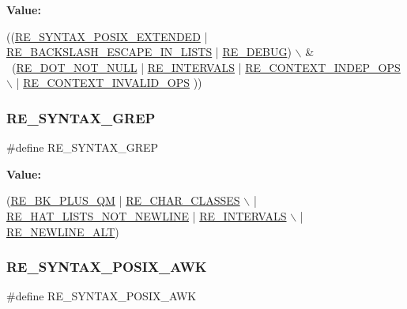 {\bfseries Value\+:}
\begin{DoxyCode}
((\hyperlink{a00092_a18701b3ee3894b158993efa18f3958ec}{RE\_SYNTAX\_POSIX\_EXTENDED} | 
      \hyperlink{a00092_a45356e84c34c98ed125ea5f75814ccc5}{RE\_BACKSLASH\_ESCAPE\_IN\_LISTS} | \hyperlink{a00092_a8b5102c6c1d783f324012804b26e82cb}{RE\_DEBUG})    \(\backslash\)
   & ~(\hyperlink{a00092_a30d6a2fb42df1a210e830f3cd3f06977}{RE\_DOT\_NOT\_NULL} | \hyperlink{a00092_a377bd32fc62adedc890f74cd18845aa9}{RE\_INTERVALS} | 
      \hyperlink{a00092_aa96ee57fb2be85936dbb14f2b4c44b50}{RE\_CONTEXT\_INDEP\_OPS}        \(\backslash\)
       | \hyperlink{a00092_ae344a4e6129c8d549a88cd5f45e86adb}{RE\_CONTEXT\_INVALID\_OPS} ))
\end{DoxyCode}
\mbox{\label{a00092_a0679ef32b84bf1bda777374de4c36e4a}} 
\subsubsection{\texorpdfstring{R\+E\+\_\+\+S\+Y\+N\+T\+A\+X\+\_\+\+G\+R\+EP}{RE\_SYNTAX\_GREP}}
{\footnotesize\ttfamily \#define R\+E\+\_\+\+S\+Y\+N\+T\+A\+X\+\_\+\+G\+R\+EP}

{\bfseries Value\+:}
\begin{DoxyCode}
(\hyperlink{a00092_a94bdc20e1e83b401d2725902a642aa1e}{RE\_BK\_PLUS\_QM}              | \hyperlink{a00092_a9650e76532d0ae7c8cc3ea5eb6dee6e7}{RE\_CHAR\_CLASSES}               \(\backslash\)
   | \hyperlink{a00092_aad6ec0e3f8f0bb3c53213e3f9ca77d8e}{RE\_HAT\_LISTS\_NOT\_NEWLINE} | \hyperlink{a00092_a377bd32fc62adedc890f74cd18845aa9}{RE\_INTERVALS}                \(\backslash\)
   | \hyperlink{a00092_a7a69bf315a61cb9d674332a6a5d64819}{RE\_NEWLINE\_ALT})
\end{DoxyCode}
\mbox{\label{a00092_a164e06f317593b352963477bdd44f7bf}} 
\subsubsection{\texorpdfstring{R\+E\+\_\+\+S\+Y\+N\+T\+A\+X\+\_\+\+P\+O\+S\+I\+X\+\_\+\+A\+WK}{RE\_SYNTAX\_POSIX\_AWK}}
{\footnotesize\ttfamily \#define R\+E\+\_\+\+S\+Y\+N\+T\+A\+X\+\_\+\+P\+O\+S\+I\+X\+\_\+\+A\+WK}

